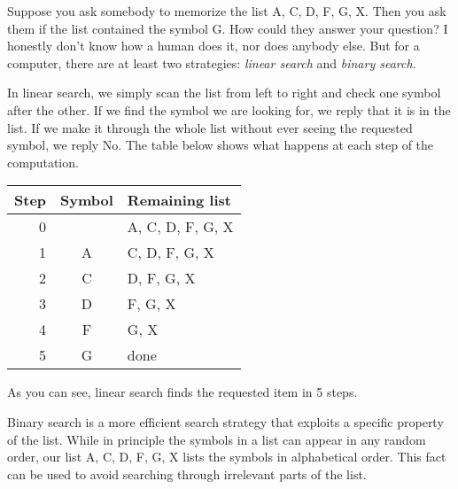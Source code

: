 \begin{examplebox}
    Suppose you ask somebody to memorize the list A, C, D, F, G, X\@.
    Then you ask them if the list contained the symbol G\@.
    How could they answer your question?
    I honestly don't know how a human does it, nor does anybody else.
    But for a computer, there are at least two strategies: \emph{linear search} and \emph{binary search}.

    In linear search, we simply scan the list from left to right and check one symbol after the other.
    If we find the symbol we are looking for, we reply that it is in the list.
    If we make it through the whole list without ever seeing the requested symbol, we reply No.
    The table below shows what happens at each step of the computation.
    \begin{center}
        \begin{tabular}{rcl}
            \toprule
            \textbf{Step} & \textbf{Symbol} & \textbf{Remaining list}\\
            \midrule
            0 &   & A, C, D, F, G, X\\
            1 & A & C, D, F, G, X\\
            2 & C & D, F, G, X\\
            3 & D & F, G, X\\
            4 & F & G, X\\
            5 & G & done\\
            \bottomrule
        \end{tabular}
    \end{center}
    As you can see, linear search finds the requested item in 5 steps.

    Binary search is a more efficient search strategy that exploits a specific property of the list.
    While in principle the symbols in a list can appear in any random order, our list A, C, D, F, G, X lists the symbols in alphabetical order.
    This fact can be used to avoid searching through irrelevant parts of the list.


\end{examplebox}
